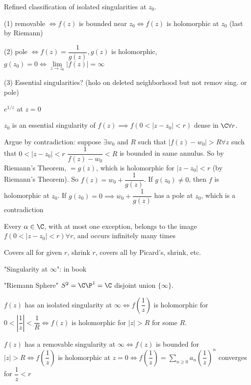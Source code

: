\documentclass[10pt]{article}
\begin{document}
\begin{defn}
   Refined classification of isolated singularities at $z_0$.
\end{defn}
(1) removable $\iff f(z)$ is bounded near $z_0 \iff f(z)$ is holomorphic at $z_0$ (last by Riemann)

(2) pole $\iff f(z) = \dfrac{1}{g(z)}, g(z)$ is holomorphic, $g(z_0) = 0 \iff \lim\limits_{z\to z_0}|f(z)| = \infty$

(3) Essential singularities? (holo on deleted neighborhood but not remov sing. or pole)

\begin{exm}
   $e^{1/z}$ at $z=0$
\end{exm}

\begin{thm}
   $z_0$ is an essential singularity of $f(z) \implies f(0 < |z-z_0| < r)$ dense in $\C \forall r$. 
\end{thm}

Argue by contradiction: suppose $\exists w_0$ and $R$ such that $|f(z) - w_0| > R \forall z$ such that $0 < |z-z_0| < r$ %
$\dfrac{1}{f(z)-w_0} < R$ is bounded in same annulus. So by Riemann's Theorem, $=g(z)$, which is holomorphic for $|z-z_0| < r$ (by Riemann's Theorem). So $f(z) = w_0 + \dfrac{1}{g(z)}$. If $g(z_0) \neq 0$, then $f$ is holomorphic at $z_0$. If $g(z_0) = 0 \implies w_0 + \dfrac{1}{g(z)}$ has a pole at $z_0$, which is a contradiction %

\begin{thm}
   Every $\alpha \in \C$, with at most one exception, belongs to the image $f(0 < |z-z_0| < r) \forall r$, and occurs infinitely many times
\end{thm}
Covers all for given $r$, shrink $r$, covers all by Picard's, shrink, etc.

"Singularity at $\infty$": in book

"Riemann Sphere" $S^2 = \C \P^1 = \C$ disjoint union $\{\infty\}$.

$f(z)$ has an isolated singularity at $\infty \iff f(\dfrac{1}{z})$ is holomorphic for $0 < \left|\dfrac{1}{z}\right| < \dfrac{1}{R} \iff f(z)$ is holomorphic for $|z| > R$ for some $R$.

$f(z)$ has a removable singularity at $\infty \iff f(z)$ is bounded for $|z| > R \iff f(\dfrac{1}{z})$ is holomorphic at $z=0 \iff f(\dfrac{1}{z}) = \sum\limits_{n\geq 0}a_n\left(\dfrac{1}{z}\right)^n$ converges for $\dfrac{1}{z} < r$
\end{document}
